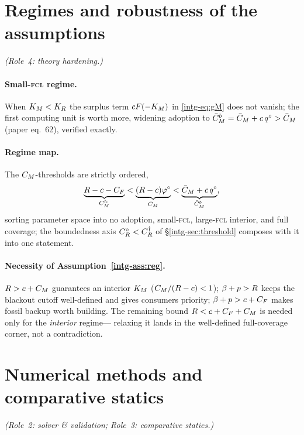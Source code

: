 \section{Regimes and robustness of the assumptions}\label{intg-sec:regimes}
\emph{(Role~4: theory hardening.)}

\paragraph{Small-\textsc{fcl} regime.} When $K_M<K_R$ the surplus term $cF(-K_M)$
in \eqref{intg-eq:gM} does not vanish; the first computing unit is worth more, widening
adoption to
$\bar C_M^{b}=\bar C_M+c\,q^{\circ}>\bar C_M$ (paper eq.~62), verified exactly.

\paragraph{Regime map.} The $C_M$-thresholds are strictly ordered,
\[
  \underbrace{R-c-C_F}_{C_M^{\mathrm{fc}}}<\underbrace{(R-c)\varphi^{\circ}}_{\bar C_M}<\underbrace{\bar C_M+c\,q^{\circ}}_{\bar C_M^{b}},
\]
sorting parameter space into no adoption, small-\textsc{fcl}, large-\textsc{fcl}
interior, and full coverage; the boundedness axis $C_R^{\circ}<C_R^{\dagger}$ of
\S\ref{intg-sec:threshold} composes with it into one statement.

\paragraph{Necessity of Assumption~\ref{intg-ass:reg}.} $R>c+C_M$ guarantees an
interior $K_M$ ($C_M/(R-c)<1$); $\beta+p>R$ keeps the blackout cutoff well-defined and
gives consumers priority; $\beta+p>c+C_F$ makes fossil backup worth building. The
remaining bound $R<c+C_F+C_M$ is needed only for the \emph{interior} regime---
relaxing it lands in the well-defined full-coverage corner, not a contradiction.

\section{Numerical methods and comparative statics}\label{intg-sec:numerics}
\emph{(Role~2: solver \& validation; Role~3: comparative statics.)}

